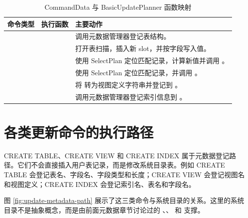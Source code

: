 \begin{table}[htbp]
  \centering
  \caption{CommandData 与 BasicUpdatePlanner 函数映射}
  \label{tab:command-to-update-function}
  \begin{tabularx}{\textwidth}{l l Y}
    \toprule
    命令类型 & 执行函数 & 主要动作 \\
    \midrule
     &  & 调用元数据管理器登记表结构。\\
     &  & 打开表扫描，插入新 slot，并按字段写入值。\\
     &  & 使用 SelectPlan 定位匹配记录，计算新值并调用 。\\
     &  & 使用 SelectPlan 定位匹配记录，并调用 。\\
     &  & 将  转为视图定义字符串并登记到 。\\
     &  & 调用元数据管理器登记索引信息到 。\\
    \bottomrule
  \end{tabularx}
\end{table}

\section{各类更新命令的执行路径}
\label{sec:update-command-paths}

CREATE TABLE、CREATE VIEW 和 CREATE INDEX 属于元数据登记路径。它们不会直接插入用户表记录，而是修改系统目录表。例如 CREATE TABLE 会登记表名、字段名、字段类型和长度；CREATE VIEW 会登记视图名和视图定义；CREATE INDEX 会登记索引名、表名和字段名。

图 \ref{fig:update-metadata-path} 展示了这三类命令与系统目录的关系。这里的系统目录不是抽象概念，而是由前面元数据章节讨论过的 、、 和  支撑。

